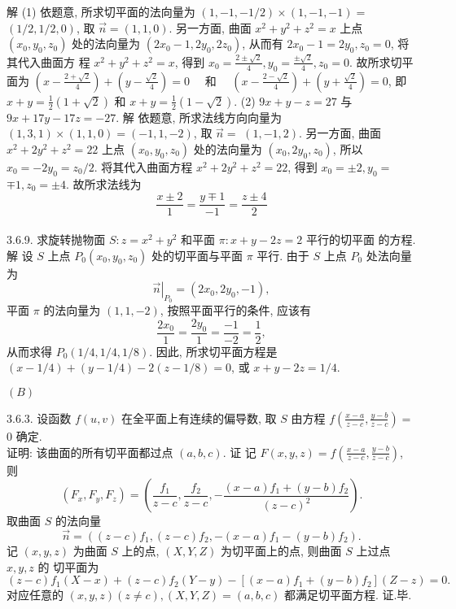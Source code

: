 \documentclass[a4paper,11pt,UTF8]{article}
\begin{document}
解 (1) 依题意, 所求切平面的法向量为 $(1,-1,-1 / 2) \times(1,-1,-1)=$ $(1 / 2,1 / 2,0)$, 取 $\vec{n}=(1,1,0)$. 另一方面, 曲面 $x^2+y^2+z^2=x$ 上点 $\left(x_0, y_0, z_0\right)$ 处的法向量为 $\left(2 x_0-1,2 y_0, 2 z_0\right)$, 从而有 $2 x_0-1=2 y_0, z_0=0$, 将其代入曲面方 程 $x^2+y^2+z^2=x$, 得到 $x_0=\frac{2 \pm \sqrt{2}}{4}, y_0=\frac{ \pm \sqrt{2}}{4}, z_0=0$. 故所求切平面为 $\left(x-\frac{2+\sqrt{2}}{4}\right)+\left(y-\frac{\sqrt{2}}{4}\right)=0 \quad$ 和 $\quad\left(x-\frac{2-\sqrt{2}}{4}\right)+\left(y+\frac{\sqrt{2}}{4}\right)=0$, 即 $x+y=\frac{1}{2}(1+\sqrt{2})$ 和 $x+y=\frac{1}{2}(1-\sqrt{2})$.
(2) $9 x+y-z=27$ 与 $9 x+17 y-17 z=-27$.
解 依题意, 所求法线方向向量为 $(1,3,1) \times(1,1,0)=(-1,1,-2)$, 取 $\vec{n}=$ $(1,-1,2)$. 另一方面, 曲面 $x^2+2 y^2+z^2=22$ 上点 $\left(x_0, y_0, z_0\right)$ 处的法向量为 $\left(x_0, 2 y_0, z_0\right)$, 所以 $x_0=-2 y_0=z_0 / 2$. 将其代入曲面方程 $x^2+2 y^2+z^2=22$, 得到 $x_0= \pm 2, y_0=$ $\mp 1, z_0= \pm 4$. 故所求法线为
$$
\frac{x \pm 2}{1}=\frac{y \mp 1}{-1}=\frac{z \pm 4}{2}
$$\\
3.6.9. 求旋转抛物面 $S: z=x^2+y^2$ 和平面 $\pi: x+y-2 z=2$ 平行的切平面 的方程.
解 设 $S$ 上点 $P_0\left(x_0, y_0, z_0\right)$ 处的切平面与平面 $\pi$ 平行. 由于 $S$ 上点 $P_0$ 处法向量 为
$$
\left.\vec{n}\right|_{P_0}=\left(2 x_0, 2 y_0,-1\right),
$$
平面 $\pi$ 的法向量为 $(1,1,-2)$, 按照平面平行的条件, 应该有
$$
\frac{2 x_0}{1}=\frac{2 y_0}{1}=\frac{-1}{-2}=\frac{1}{2},
$$
从而求得 $P_0(1 / 4,1 / 4,1 / 8)$. 因此, 所求切平面方程是 $(x-1 / 4)+(y-1 / 4)-2(z-1 / 8)=0$, 或 $x+y-2 z=1 / 4$.\\
\centerline{$(B)$}
3.6.3. 设函数 $f(u, v)$ 在全平面上有连续的偏导数, 取 $S$ 由方程 $f\left(\frac{x-a}{z-c}, \frac{y-b}{z-c}\right)=$ 0 确定.\\
证明: 该曲面的所有切平面都过点 $(a, b, c)$.
证 记 $F(x, y, z)=f\left(\frac{x-a}{z-c}, \frac{y-b}{z-c}\right)$, 则
$$
\left(F_x, F_y, F_z\right)=\left(\frac{f_1}{z-c}, \frac{f_2}{z-c},-\frac{(x-a) f_1+(y-b) f_2}{(z-c)^2}\right) .
$$
取曲面 $S$ 的法向量
$$
\vec{n}=\left((z-c) f_1,(z-c) f_2,-(x-a) f_1-(y-b) f_2\right) .
$$
记 $(x, y, z)$ 为曲面 $S$ 上的点, $(X, Y, Z)$ 为切平面上的点, 则曲面 $S$ 上过点 $x, y, z$ 的 切平面为
$$
(z-c) f_1(X-x)+(z-c) f_2(Y-y)-\left[(x-a) f_1+(y-b) f_2\right](Z-z)=0 .
$$
对应任意的 $(x, y, z)(z \neq c),(X, Y, Z)=(a, b, c)$ 都满足切平面方程. 证.毕.
\end{document}
